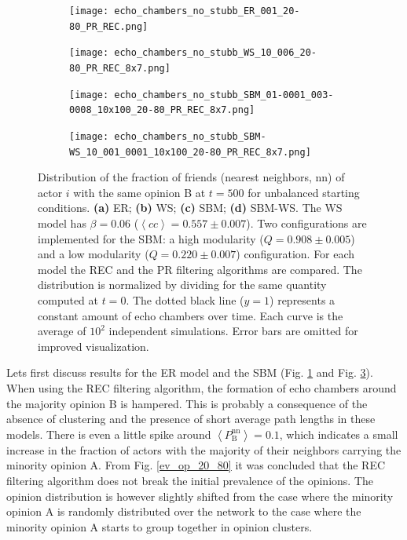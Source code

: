 \documentclass[11 pt , letterpaper , twoside , openright]{book}
\begin{document}
\begin{figure}[H]
  \begin{subfigure}[b]{0.49\textwidth}
    \caption{}
  	\texttt{[image: echo\_chambers\_no\_stubb\_ER\_001\_20-80\_PR\_REC.png]}
    \label{er_echo_20-80}
  \end{subfigure}
  \begin{subfigure}[b]{0.49\textwidth}
    \caption{}
  	\texttt{[image: echo\_chambers\_no\_stubb\_WS\_10\_006\_20-80\_PR\_REC\_8x7.png]}
    \label{ws}
  \end{subfigure}
  \begin{subfigure}[b]{0.49\textwidth}
    \caption{}
    \texttt{[image: echo\_chambers\_no\_stubb\_SBM\_01-0001\_003-0008\_10x100\_20-80\_PR\_REC\_8x7.png]}
  	\label{sbm}    
  \end{subfigure}
  \begin{subfigure}[b]{0.49\textwidth}
    \caption{}
    \texttt{[image: echo\_chambers\_no\_stubb\_SBM-WS\_10\_001\_0001\_10x100\_20-80\_PR\_REC\_8x7.png]}
    \label{sbm-ws}
  \end{subfigure}
  \captionsetup{format=plain}
  \caption[Distribution of the fraction of friends (nearest neighbors, nn) of actor $i$ with the same opinion B at $t=500$, $\left<P_\text{B}^{\text{nn}}\right>$, for unbalanced starting conditions.]{Distribution of the fraction of friends (nearest neighbors, nn) of actor $i$ with the same opinion B at $t = 500$ for unbalanced starting conditions. \textbf{(a)} ER; \textbf{(b)} WS; \textbf{(c)} SBM; \textbf{(d)} SBM-WS. The WS model has $\beta = 0.06$ ($\left<cc\right> = 0.557 \pm 0.007$). Two configurations are implemented for the SBM: a high modularity ($Q = 0.908 \pm 0.005$) and a low modularity ($Q = 0.220 \pm 0.007$) configuration. For each model the REC and the PR filtering algorithms are compared. The distribution is normalized by dividing for the same quantity computed at $t=0$. The dotted black line ($y=1$) represents a constant amount of echo chambers over time. Each curve is the average of $10^2$ independent simulations. Error bars are omitted for improved visualization.}
\label{echo_20_80}
\end{figure}
\noindent
Lets first discuss results for the ER model and the SBM (Fig. \ref{er_echo_20-80} and Fig. \ref{sbm}). When using the REC filtering algorithm, the formation of echo chambers around the majority opinion B is hampered. This is probably a consequence of the absence of clustering and the presence of short average path lengths in these models. There is even a little spike around $\left<P_\text{B}^{\text{nn}}\right> = 0.1$, which indicates a small increase in the fraction of actors with the majority of their neighbors carrying the minority opinion A. From Fig. \ref{ev_op_20_80} it was concluded that the REC filtering algorithm does not break the initial prevalence of the opinions. The opinion distribution is however slightly shifted from the case where the minority opinion A is randomly distributed over the network to the case where the minority opinion A starts to group together in opinion clusters. \\
\end{document}
